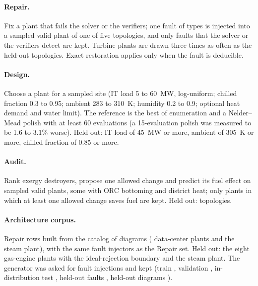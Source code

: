 \paragraph{Repair.} Fix a plant that fails the solver or the verifiers; one fault of  types is injected into a sampled valid plant of one of five topologies, and only faults that the solver or the verifiers detect are kept. Turbine plants are drawn three times as often as the held-out topologies. Exact restoration applies only when the fault is deducible.

\paragraph{Design.} Choose a plant for a sampled site (IT load 5 to 60~MW, log-uniform; chilled fraction 0.3 to 0.95; ambient 283 to 310~K; humidity 0.2 to 0.9; optional heat demand and water limit). The reference is the best of enumeration and a Nelder--Mead polish with at least 60 evaluations (a 15-evaluation polish was measured to be 1.6 to 3.1\% worse). Held out: IT load of 45~MW or more, ambient of 305~K or more, chilled fraction of 0.85 or more.

\paragraph{Audit.} Rank exergy destroyers, propose one allowed change and predict its fuel effect on sampled valid plants, some with ORC bottoming and district heat; only plants in which at least one allowed change saves fuel are kept. Held out: topologies.

\paragraph{Architecture corpus.} Repair rows built from the catalog of  diagrams ( data-center plants and the steam plant), with the same fault injectors as the Repair set. Held out: the eight gas-engine plants with the ideal-rejection boundary and the steam plant. The generator was asked for  fault injections and kept 
(train , validation , in-distribution test , held-out faults , held-out diagrams ).

